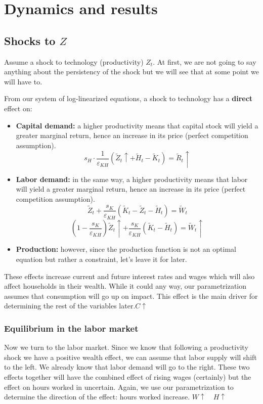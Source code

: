 \documentclass[12pt]{report}
\begin{document}
\section{Dynamics and results}

\subsection{Shocks to $Z$}

Assume a shock to technology (productivity) $Z_t$. At first, we are not going to say anything about the persistency of the shock but we will see that at some point we will have to.

From our system of log-linearized equations, a shock to technology has a \textbf{direct} effect on:\begin{itemize}
\item \textbf{Capital demand:} a higher productivity means that capital stock will yield a greater marginal return, hence an increase in its price (perfect competition assumption). $$ s_{H}\cdot \frac{1}{\varepsilon_{KH}}(\tilde Z_t \uparrow + \tilde H_t - \tilde K_t) = \tilde R_t \uparrow $$
\item \textbf{Labor demand:} in the same way, a higher productivity means that labor will yield a greater marginal return, hence an increase in its price (perfect competition assumption). $$ \tilde Z_t + \frac{s_{K}}{\varepsilon_{KH}}(\tilde K_t - \tilde Z_t - \tilde H_t) = \tilde W_t  $$ $$ (1 - \frac{s_{K}}{\varepsilon_{KH}}) \tilde Z_t\uparrow + \frac{s_{K}}{\varepsilon_{KH}}(\tilde K_t - \tilde H_t) = \tilde W_t \uparrow $$
\item \textbf{Production:} however, since the production function is not an optimal equation but rather a constraint, let's leave it for later.
\end{itemize}

These effects increase current and future interest rates and wages which will also affect households in their wealth. While it could any way, our parametrization assumes that consumption will go up on impact. This effect is the main driver for determining the rest of the variables later.$ C\uparrow $

\subsubsection{Equilibrium in the labor market}

Now we turn to the labor market. Since we know that following a productivity shock we have a positive wealth effect, we can assume that labor supply will shift to the left. We already know that labor demand will go to the right. These two effects together will have the combined effect of rising wages (certainly) but the effect on hours worked in uncertain. Again, we use our parametrization to determine the direction of the effect: hours worked increase. $W\uparrow \quad H\uparrow $
\end{document}
